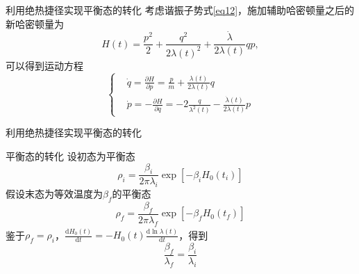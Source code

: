 \documentclass{beamer}
\newcommand{\upcite}[1]{\textsuperscript{\cite{#1}}}  %
\newcommand{\DD}[2]{\frac{\mathrm{d} #1}{\mathrm{d} #2}}
\begin{document}
\begin{frame}{利用绝热捷径实现平衡态的转化}
考虑谐振子势式\eqref{eq12}，施加辅助哈密顿量之后的新哈密顿量为
\begin{equation}
    H(t)=\frac{p^{2}}{2}+\frac{q^2}{2 \lambda(t)^{2}}+\frac{\dot{\lambda}}{2 \lambda(t)} q p,
    \label{eq13.5}
\end{equation}
\pause
可以得到运动方程
\begin{equation}
    \left\{\begin{aligned}
        &\dot{q}=\frac{\partial H}{\partial p}=\frac{p}{m}+\frac{\lambda(t)}{2 \lambda(t)} q \\
        &\dot{p}=-\frac{\partial H}{\partial q}=-2  \frac{q}{\lambda^{2}(t)}-\frac{\dot{\lambda}(t)}{2 \lambda(t)} p
    \end{aligned}\right.
    \label{eq14}
\end{equation}
\end{frame}

\begin{frame}{利用绝热捷径实现平衡态的转化}
\begin{alertblock}{平衡态的转化}
设初态为平衡态
\begin{equation}
    \rho_{i}=\frac{\beta_{i}}{2 \pi \lambda_{i}} \exp \left[-\beta_{i} H_0 \left(t_{i}\right)\right]
    \label{eq16}
\end{equation}
\pause
假设末态为等效温度为$\beta_{f}$的平衡态
\begin{equation}
    \rho_{f}=\frac{\beta_{f} }{2 \pi \lambda_{f}} \exp \left[-\beta_{f} H_0 \left(t_{f}\right)\right]
    \label{eq17}
\end{equation}
\pause
鉴于$\rho_{f}=\rho_{i}$，$\DD{H_0 (t)}{t}=-H_0 (t) \DD{\ln{\lambda(t)}}{t}$，得到\upcite{Tu2013}
\begin{equation}
    \frac{\beta_f}{\lambda_f} = \frac{\beta_i}{\lambda_i}
    \label{eq18}
\end{equation}
\end{alertblock}
\end{frame}
\end{document}
